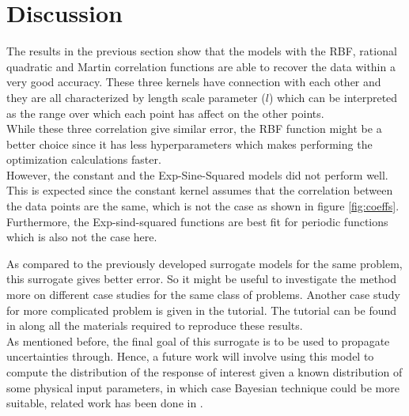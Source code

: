 \documentclass{anstrans}
\begin{document}
\section{Discussion}
The results in the previous section show that the models with the RBF, rational quadratic and Martin correlation functions are able to recover the data within a very good accuracy. 
These three kernels have connection with each other and they are all characterized by length scale parameter ($l$) which can be interpreted as the range over which each point has affect on the other points.\\
While these three correlation give similar error, the RBF function might be a better choice since it has less hyperparameters which makes performing the optimization calculations faster.\\
However, the constant and the Exp-Sine-Squared models did not perform well. This is expected since the constant kernel assumes that the correlation between the data points are the same, which is not the case as shown in figure \ref{fig:coeffs}. 
Furthermore, the Exp-sind-squared functions are best fit for periodic functions which is also not the case here.

As compared to the previously developed surrogate models for the same problem, this surrogate gives better error. So it might be useful to investigate the method more on different case studies for the same class of problems. 
Another case study for more complicated problem is given in the tutorial. The tutorial can be found in   \cite{RababGit} along all the materials required to reproduce these results.\\

As mentioned before, the final goal of this surrogate is to be used to propagate uncertainties through. Hence, a future work will involve using this model to compute the distribution of the response of interest given a known distribution of some physical input parameters, in which case Bayesian technique could be more suitable, related work has been done in \cite{assessing} .

 


\end{document}
